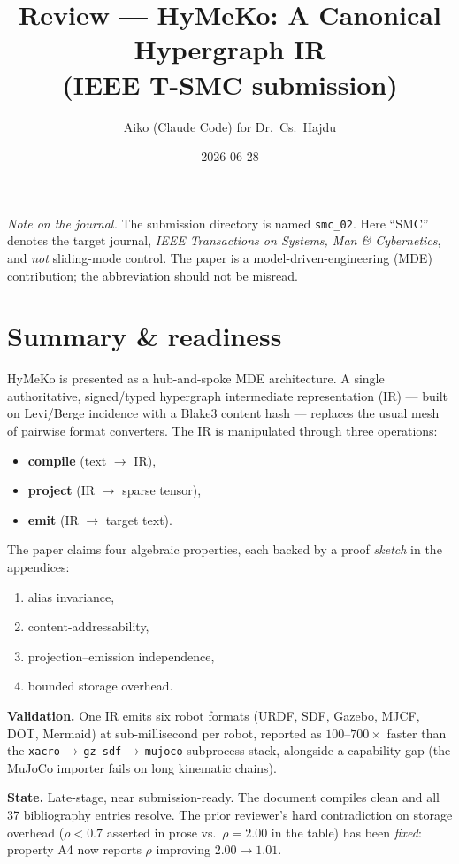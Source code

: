 \documentclass[11pt]{article}
\title{Review --- HyMeKo: A Canonical Hypergraph IR\\\large (IEEE T-SMC submission)}
\author{Aiko (Claude Code) for Dr.\ Cs.\ Hajdu}
\date{2026-06-28}
\newcommand{\file}[1]{\texttt{#1}}
\begin{document}
\maketitle

\noindent\textit{Note on the journal.} The submission directory is named \file{smc\_02}. Here ``SMC'' denotes the target journal, \emph{IEEE Transactions on Systems, Man \& Cybernetics}, and \emph{not} sliding-mode control. The paper is a model-driven-engineering (MDE) contribution; the abbreviation should not be misread.

\section{Summary \& readiness}

HyMeKo is presented as a hub-and-spoke MDE architecture. A single authoritative, signed/typed hypergraph intermediate representation (IR) --- built on Levi/Berge incidence with a Blake3 content hash --- replaces the usual mesh of pairwise format converters. The IR is manipulated through three operations:
\begin{itemize}
  \item \textbf{compile} (text $\rightarrow$ IR),
  \item \textbf{project} (IR $\rightarrow$ sparse tensor),
  \item \textbf{emit} (IR $\rightarrow$ target text).
\end{itemize}

\noindent The paper claims four algebraic properties, each backed by a proof \emph{sketch} in the appendices:
\begin{enumerate}
  \item alias invariance,
  \item content-addressability,
  \item projection--emission independence,
  \item bounded storage overhead.
\end{enumerate}

\noindent\textbf{Validation.} One IR emits six robot formats (URDF, SDF, Gazebo, MJCF, DOT, Mermaid) at sub-millisecond per robot, reported as $100$--$700\times$ faster than the \texttt{xacro}\,$\rightarrow$\,\texttt{gz sdf}\,$\rightarrow$\,\texttt{mujoco} subprocess stack, alongside a capability gap (the MuJoCo importer fails on long kinematic chains).

\noindent\textbf{State.} Late-stage, near submission-ready. The document compiles clean and all 37 bibliography entries resolve. The prior reviewer's hard contradiction on storage overhead ($\rho < 0.7$ asserted in prose vs.\ $\rho = 2.00$ in the table) has been \emph{fixed}: property A4 now reports $\rho$ improving $2.00 \rightarrow 1.01$.
\end{document}
